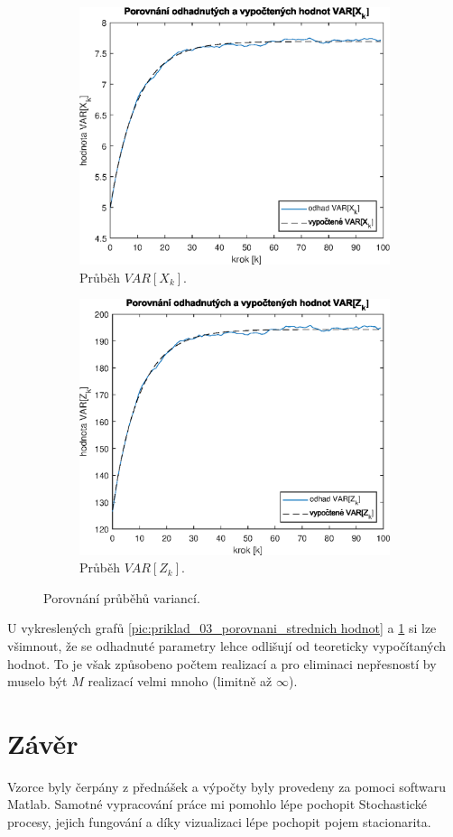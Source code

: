 \documentclass{article}
\begin{document}
			\begin{figure}[H]
				\begin{subfigure}[h]{.5\textwidth}
					\centering
					\includegraphics[width=\textwidth]{./Graphics/priklad_03_porovnani_VAR_X}
					\caption{Průběh \(VAR[X_{k}]\).}
				\end{subfigure}
				\hfill
				\begin{subfigure}[h]{.5\textwidth}
					\centering
					\includegraphics[width=\textwidth]{./Graphics/priklad_03_porovnani_VAR_Z}
					\caption{Průběh \(VAR[Z_{k}]\).}
				\end{subfigure}
				\caption{Porovnání průběhů variancí.}
				\label{pic:priklad_03_porovnani_varianci}
			\end{figure}
			U vykreslených grafů \ref{pic:priklad_03_porovnani_strednich hodnot} a \ref{pic:priklad_03_porovnani_varianci} si lze všimnout, že se odhadnuté parametry lehce odlišují od teoreticky vypočítaných hodnot. To je však způsobeno počtem realizací a pro eliminaci nepřesností by muselo být \(M\) realizací velmi mnoho (limitně až \(\infty\)).
	\newpage
	\section{Závěr}
		Vzorce byly čerpány z přednášek a výpočty byly provedeny za pomoci softwaru Matlab. Samotné vypracování práce mi pomohlo lépe pochopit Stochastické procesy, jejich fungování a díky vizualizaci lépe pochopit pojem stacionarita.
\end{document}
